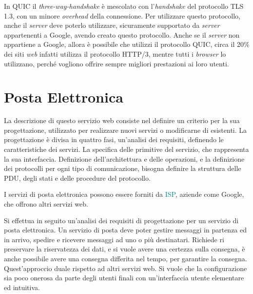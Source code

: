 \documentclass{article}
\numberwithin{equation}{subsection}
\begin{document}
In QUIC il \textit{three-way-handshake} è mescolato con l'\textit{handshake} del protocollo TLS 1.3, con un minore \textit{overhead} della connessione. Per utilizzare questo protocollo, 
anche il \textit{server} deve poterlo utilizzare, sicuramente supportato da \textit{server} appartenenti a Google, avendo creato questo protocollo. Anche se il 
\textit{server} non appartiene a Google, allora è possibile che utilizzi il protocollo QUIC, circa il 20\% dei siti \textit{web} infatti utilizza il protocollo \textcolor{NavyBlue}{HTTP}/3, mentre tutti i 
\textit{browser} lo utilizzano, perché vogliono offrire sempre migliori prestazioni ai loro utenti. 

\clearpage

\section{Posta Elettronica}

La descrizione di questo servizio web consiste nel definire un criterio per la sua progettazione, utilizzato per realizzare nuovi servizi o modificarne di esistenti. 
La progettazione è divisa in quattro fasi, un'analisi dei requisiti, definendo le caratteristiche dei servizi. La specifica delle primitive del servizio, che rappresenta la sua interfaccia. 
Definizione dell'architettura e delle operazioni, e la definizione dei protocolli per ogni tipo di comunicazione, bisogna definire la struttura delle PDU, degli stati e delle procedure del protocollo. 

I servizi di posta elettronica possono essere forniti da \textcolor{teal}{ISP}, aziende come Google, che offrono altri servizi web. 


Si effettua in seguito un'analisi dei requisiti di progettazione per un servizio di posta elettronica. 
Un servizio di posta deve poter gestire messaggi in partenza ed in arrivo, spedire e ricevere messaggi ad uno o più 
destinatari. Richiede ri preservare la riservatezza dei dati, e si vuole avere una certezza sulla consegna, è anche possibile avere una consegna 
differita nel tempo, per garantire la consegna. Quest'approccio duale rispetto ad altri servizi web. 
Si vuole che la configurazione sia poco onerosa da parte degli utenti finali con un'interfaccia utente 
elementare ed intuitiva. 
\end{document}
